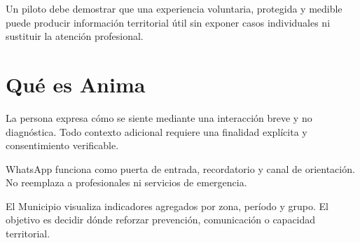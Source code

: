 \documentclass[11pt,a4paper]{article}
\begin{document}
\vspace{4mm}
\begin{softcard}
  Un piloto debe demostrar que una experiencia voluntaria, protegida y medible puede producir información territorial útil sin exponer casos individuales ni sustituir la atención profesional.
\end{softcard}

\clearpage

\section{Qué es Anima}

\begin{minipage}[t]{.37\textwidth}
  \vspace{0pt}\centering
  \phoneframe[.54\linewidth]{\AnimaMoodImage}
  \par{}
\end{minipage}\hfill
\begin{minipage}[t]{.59\textwidth}
  \vspace{0pt}
  \begin{card}[fontupper=\small,top=3mm,bottom=3mm]
    La persona expresa cómo se siente mediante una interacción breve y no diagnóstica. Todo contexto adicional requiere una finalidad explícita y consentimiento verificable.
  \end{card}
  \begin{card}[fontupper=\small,top=3mm,bottom=3mm]
    WhatsApp funciona como puerta de entrada, recordatorio y canal de orientación. No reemplaza a profesionales ni servicios de emergencia.
  \end{card}
  \begin{card}[fontupper=\small,top=3mm,bottom=3mm]
    El Municipio visualiza indicadores agregados por zona, período y grupo. El objetivo es decidir dónde reforzar prevención, comunicación o capacidad territorial.
  \end{card}
\end{minipage}
\end{document}
